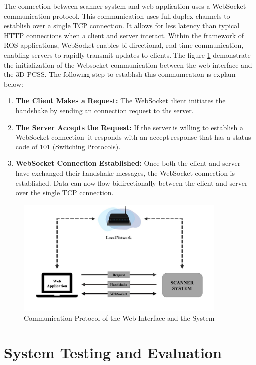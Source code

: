 The connection between scanner system and web application uses a WebSocket communication protocol. This communication uses full-duplex channels to establish over a single TCP connection. It allows for less latency than typical HTTP connections when a client and server interact. Within the framework of ROS applications, WebSocket enables bi-directional, real-time communication, enabling servers to rapidly transmit updates to clients. The figure \ref{ch3:fig:websocket-connection} demonstrate the initialization of the Websocket communication between the web interface and the 3D-PCSS. The following step to establish this communication is explain below:

\begin{enumerate}
	\item \textbf{The Client Makes a Request:} The WebSocket client initiates the handshake by sending an connection request to the server.
	\item \textbf{The Server Accepts the Request:} If the server is willing to establish a WebSocket connection, it responds with an accept response that has a status code of 101 (Switching Protocols).
	\item \textbf{WebSocket Connection Established:} Once both the client and server have exchanged their handshake messages, the WebSocket connection is established. Data can now flow bidirectionally between the client and server over the single TCP connection.
\end{enumerate}

\begin{figure}[H]
	\centering
	\includegraphics[width=0.9\textwidth]{Figures/websocket-connection}
	\caption{Communication Protocol of the Web Interface and the System}
	\label{ch3:fig:websocket-connection}
\end{figure}

\section{System Testing and Evaluation}
\label{ch3:sec:TestingAndEvaluation}

